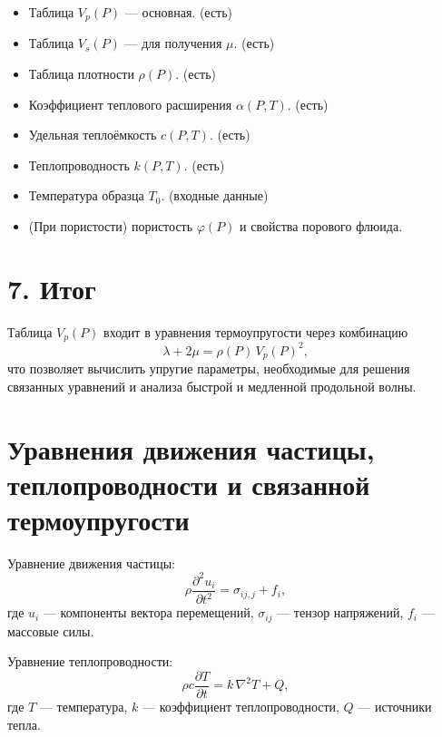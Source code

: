 \documentclass[12pt]{article}
\begin{document}
\begin{itemize}
    \item Таблица $V_p(P)$ — основная. (есть)
    
    \item Таблица $V_s(P)$ — для получения $\mu$. (есть)

    \item Таблица плотности $\rho(P)$. (есть)
    
    \item Коэффициент теплового расширения $\alpha(P,T)$. (есть)
    
    \item Удельная теплоёмкость $c(P,T)$. (есть)
    
    \item Теплопроводность $k(P,T)$. (есть)
    
    \item Температура образца $T_0$. (входные данные)
    
    \item (При пористости) пористость $\varphi(P)$ и свойства порового флюида. 
\end{itemize}

\section*{7. Итог}

Таблица $V_p(P)$ входит в уравнения термоупругости через комбинацию
\begin{equation}
\lambda + 2\mu = \rho(P)\,V_p(P)^2,
\end{equation}
что позволяет вычислить упругие параметры, необходимые для решения связанных уравнений и анализа быстрой и медленной продольной волны.

\section{Уравнения движения частицы, теплопроводности и связанной термоупругости}

Уравнение движения частицы:
\begin{equation}
\rho \frac{\partial^2 u_i}{\partial t^2} = \sigma_{ij,j} + f_i,
\end{equation}
где $u_i$ --- компоненты вектора перемещений, $\sigma_{ij}$ --- тензор напряжений, $f_i$ --- массовые силы.

Уравнение теплопроводности:
\begin{equation}
\rho c \frac{\partial T}{\partial t} = k \, \nabla^2 T + Q,
\end{equation}
где $T$ — температура, $k$ — коэффициент теплопроводности, $Q$ — источники тепла.
\end{document}

